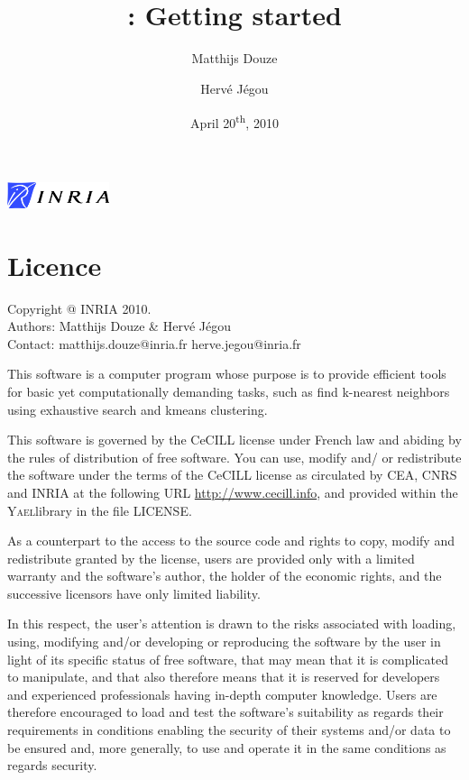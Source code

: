 \documentclass[a4paper,11pt,notitlepage,final,twoside]{report}
\title{~\vspace{9cm} \\ \yael: Getting started}
\author{Matthijs Douze \and Herv\'e J\'egou}
\date{April 20\textsuperscript{th}, 2010}
\newcommand{\yael}{\textsc{Yael}}
\begin{document}
\maketitle
\thispagestyle{empty}

\vfill

\includegraphics[width=3cm]{./figs/logoinria}


\newpage

\chapter*{Licence}

\thispagestyle{empty}

Copyright @ INRIA 2010. \\
Authors: Matthijs Douze \& Herv\'e J\'egou \\
Contact: matthijs.douze@inria.fr  herve.jegou@inria.fr \\
\medskip

This software is a computer program whose purpose is to provide 
efficient tools for basic yet computationally demanding tasks, 
such as find k-nearest neighbors using exhaustive search 
and kmeans clustering. 
\medskip

This software is governed by the CeCILL license under French law and
abiding by the rules of distribution of free software.  You can  use, 
modify and/ or redistribute the software under the terms of the CeCILL
license as circulated by CEA, CNRS and INRIA at the following URL
\url{http://www.cecill.info}, and provided within the \yael library 
in the file LICENSE. 
\medskip

As a counterpart to the access to the source code and  rights to copy,
modify and redistribute granted by the license, users are provided only
with a limited warranty  and the software's author,  the holder of the
economic rights,  and the successive licensors  have only  limited
liability. 
\medskip

In this respect, the user's attention is drawn to the risks associated
with loading,  using,  modifying and/or developing or reproducing the
software by the user in light of its specific status of free software,
that may mean  that it is complicated to manipulate,  and  that  also
therefore means  that it is reserved for developers  and  experienced
professionals having in-depth computer knowledge. Users are therefore
encouraged to load and test the software's suitability as regards their
requirements in conditions enabling the security of their systems and/or 
data to be ensured and,  more generally, to use and operate it in the 
same conditions as regards security. 
\medskip
\end{document}
